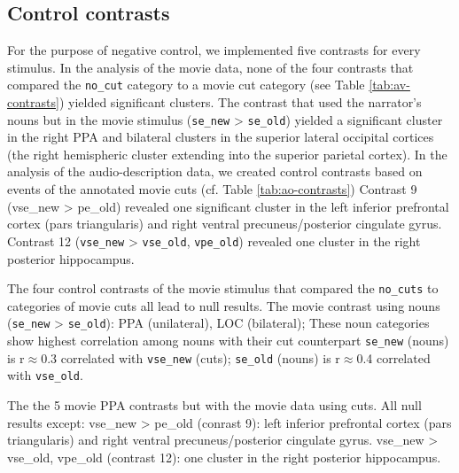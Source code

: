 \documentclass[english]{article}
\begin{document}


\subsection{Control contrasts}




For the purpose of negative control, we implemented five contrasts for every
stimulus.
In the analysis of the movie data, none of the four contrasts that compared the
\texttt{no\_cut} category to a movie cut category (see Table
\ref{tab:av-contrasts}) yielded significant clusters.
The contrast that used the narrator's nouns but in the movie stimulus
(\texttt{se\_new} > \texttt{se\_old}) yielded a significant cluster in the right
PPA and bilateral clusters in the superior lateral occipital cortices (the right
hemispheric cluster extending into the superior parietal cortex).
In the analysis of the audio-description data, we created control contrasts based on events of
the annotated movie cuts (cf. Table \ref{tab:ao-contrasts})
Contrast 9 (vse\_new > pe\_old) revealed one significant cluster in the left
inferior prefrontal cortex (pars triangularis) and right ventral
precuneus/posterior cingulate gyrus.
Contrast 12 (\texttt{vse\_new} > \texttt{vse\_old}, \texttt{vpe\_old}) revealed
one cluster in the right posterior hippocampus.



The four control contrasts of the movie stimulus that compared the
\texttt{no\_cuts} to categories of movie cuts all lead to null results.
The movie contrast using nouns (\texttt{se\_new} > \texttt{se\_old}): PPA
(unilateral), LOC (bilateral); These noun categories show highest correlation
among nouns with their cut counterpart \texttt{se\_new} (nouns) is r$\approx$0.3
correlated with \texttt{vse\_new} (cuts); \texttt{se\_old} (nouns) is
r$\approx$0.4 correlated with \texttt{vse\_old}.

The the 5 movie PPA contrasts but with the movie data using cuts. All null results
except:
vse\_new > pe\_old (conrast 9): left inferior prefrontal cortex (pars
triangularis) and right ventral precuneus/posterior cingulate gyrus.
vse\_new > vse\_old, vpe\_old (contrast 12): one cluster in the right posterior
hippocampus.
\end{document}
